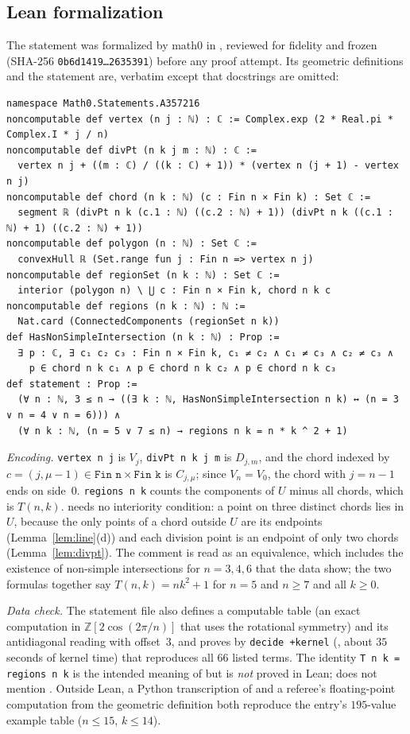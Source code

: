 \documentclass[11pt]{amsart}
\theoremstyle{plain}
\theoremstyle{definition}
\begin{document}
\subsection*{Lean formalization}
The statement was formalized by math0 in , reviewed for fidelity and frozen (SHA-256 \texttt{0b6d1419\ldots 2635391}) before any proof attempt. Its geometric definitions and the statement are, verbatim except that docstrings are omitted:
\begin{lstlisting}[basicstyle=\ttfamily\scriptsize]
namespace Math0.Statements.A357216
noncomputable def vertex (n j : ℕ) : ℂ := Complex.exp (2 * Real.pi * Complex.I * j / n)
noncomputable def divPt (n k j m : ℕ) : ℂ :=
  vertex n j + ((m : ℂ) / ((k : ℂ) + 1)) * (vertex n (j + 1) - vertex n j)
noncomputable def chord (n k : ℕ) (c : Fin n × Fin k) : Set ℂ :=
  segment ℝ (divPt n k (c.1 : ℕ) ((c.2 : ℕ) + 1)) (divPt n k ((c.1 : ℕ) + 1) ((c.2 : ℕ) + 1))
noncomputable def polygon (n : ℕ) : Set ℂ :=
  convexHull ℝ (Set.range fun j : Fin n => vertex n j)
noncomputable def regionSet (n k : ℕ) : Set ℂ :=
  interior (polygon n) \ ⋃ c : Fin n × Fin k, chord n k c
noncomputable def regions (n k : ℕ) : ℕ :=
  Nat.card (ConnectedComponents (regionSet n k))
def HasNonSimpleIntersection (n k : ℕ) : Prop :=
  ∃ p : ℂ, ∃ c₁ c₂ c₃ : Fin n × Fin k, c₁ ≠ c₂ ∧ c₁ ≠ c₃ ∧ c₂ ≠ c₃ ∧
    p ∈ chord n k c₁ ∧ p ∈ chord n k c₂ ∧ p ∈ chord n k c₃
def statement : Prop :=
  (∀ n : ℕ, 3 ≤ n → ((∃ k : ℕ, HasNonSimpleIntersection n k) ↔ (n = 3 ∨ n = 4 ∨ n = 6))) ∧
  (∀ n k : ℕ, (n = 5 ∨ 7 ≤ n) → regions n k = n * k ^ 2 + 1)
\end{lstlisting}
\emph{Encoding.} \texttt{vertex n j} is $V_j$, \texttt{divPt n k j m} is $D_{j,m}$, and the chord indexed by $c=(j,\mu-1)\in\texttt{Fin n}\times\texttt{Fin k}$ is $C_{j,\mu}$; since $V_n=V_0$, the chord with $j=n-1$ ends on side~$0$. \texttt{regions n k} counts the components of $U$ minus all chords, which is $T(n,k)$.  needs no interiority condition: a point on three distinct chords lies in $U$, because the only points of a chord outside $U$ are its endpoints (Lemma~\ref{lem:line}(d)) and each division point is an endpoint of only two chords (Lemma~\ref{lem:divpt}). The comment is read as an equivalence, which includes the existence of non-simple intersections for $n=3,4,6$ that the data show; the two formulas together say $T(n,k)=nk^2+1$ for $n=5$ and $n\ge7$ and all $k\ge0$.

\emph{Data check.} The statement file also defines a computable table  (an exact computation in $\mathbb{Z}[2\cos(2\pi/n)]$ that uses the rotational symmetry) and its antidiagonal reading  with offset~$3$, and proves by \texttt{decide +kernel} (, about $35$ seconds of kernel time) that  reproduces all $66$ listed terms. The identity \texttt{T n k = regions n k} is the intended meaning of  but is \emph{not} proved in Lean;  does not mention . Outside Lean, a Python transcription of  and a referee's floating-point computation from the geometric definition both reproduce the entry's $195$-value example table ($n\le15$, $k\le14$).
\end{document}
